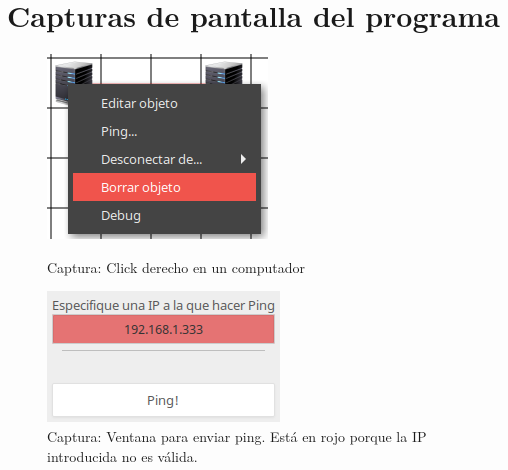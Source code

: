 \documentclass[a4paper, 11pt]{report} %
\begin{document}
\chapter{Capturas de pantalla del programa}
\noindent\begin{figure}[H]
\centering
\begin{minipage}[t]{0.4\textwidth}
	\centering
	\includegraphics[scale=0.6]{Resources/Screenshots/2016-09-12-172627_1000x700_scrot.png}%
	\caption{Captura: Click derecho en un computador}
\end{minipage}
\hspace*{0.15\textwidth}
\begin{minipage}[t]{0.4\textwidth}
	\centering
	\includegraphics[width=\textwidth]{Resources/Screenshots/2016-09-12-225752_233x131_scrot.png}%
	\caption[Captura: Ventana para enviar ping.]{Captura: Ventana para enviar ping. Está en rojo porque la IP introducida no es válida.}
	\label{fig:pingwindow}
\end{minipage}


\end{figure}
\end{document}
